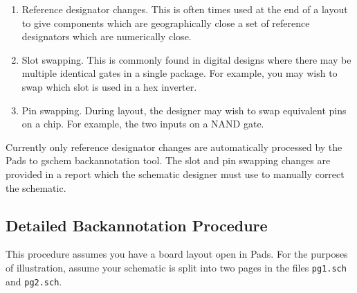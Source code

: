 \documentclass{article}
\begin{document}
\begin{enumerate}
\item Reference designator changes.  This is often times used at the
end of a layout to give components which are geographically close a
set of reference designators which are numerically close.

\item Slot swapping.  This is commonly found in digital designs where
there may be multiple identical gates in a single package.  For
example, you may wish to swap which slot is used in a hex inverter.

\item Pin swapping.  During layout, the designer may wish to swap
equivalent pins on a chip.  For example, the two inputs on a NAND
gate.
\end{enumerate}

Currently only reference designator changes are automatically
processed by the Pads to gschem backannotation tool.  The slot and pin
swapping changes are provided in a report which the schematic designer
must use to manually correct the schematic.

\subsection{Detailed Backannotation Procedure}
This procedure assumes you have a board layout open in Pads.  For the
purposes of illustration, assume your schematic is split into two
pages in the files {\tt pg1.sch} and {\tt pg2.sch}.
\end{document}
